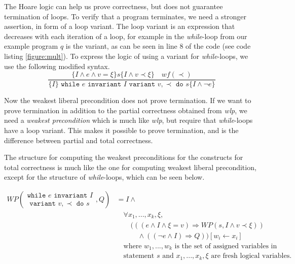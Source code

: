 
The Hoare logic can help us prove correctness, but does not guarantee termination of loops. To verify that a program terminates, we need a stronger assertion, in form of a loop variant.
The loop variant is an expression that decreases with each iteration of a loop, for example in the \textit{while}-loop from our example program $q$ is the variant, as can be seen in line 8 of the code (see code listing \autoref{figure:mult}).
To express the logic of using a variant for \textit{while}-loops, we use the following modified syntax.
$$
	\frac{
		\{I \land e \land v = \xi \} s \{I \land v \prec \xi \} \quad wf(\prec)
	}{
		\{I\} \texttt{ while } e \texttt{ invariant } I 
          \texttt{ variant } v, \prec \texttt{ do } s \{I \land \neg e\}
	}
$$

Now the weakest liberal precondition does not prove termination. If we want to prove termination in addition to the partial correctness obtained from \textit{wlp}, we need a \textit{weakest precondition} which is much like \textit{wlp}, but require that \textit{while}-loops have a loop variant. 
This makes it possible to prove termination, and is the difference between partial and total correctness.

The structure for computing the weakest preconditions for the constructs for total correctness is much like the one for computing weakest liberal precondition, except for the structure of \textit{while}-loops, which can be seen below.

\begin{align*}
	WP\left(
     \begin{array}{c}
     \texttt{while } e \texttt{ invariant } I \\
     \texttt{ variant } v, \prec \texttt{ do } s
     \end{array}
    , Q \right) 
    &= 
		I \land \\
    &\quad \forall x_1, ..., x_k, \xi, \\
    &\quad \quad (((e \land I \land \xi = v) \Rightarrow WP(s, I \land v \prec \xi)) \\
    &\quad \quad \quad \land ((\neg e \land I) \Rightarrow Q)) [w_i \leftarrow x_i] \\
	&\quad \text{where } w_1, ..., w_k \text{ is the set of assigned variables in} \\
  &\quad \text{statement } s \text{ and } x_1, ..., x_k, \xi \text{ are fresh logical variables.}
\end{align*}

